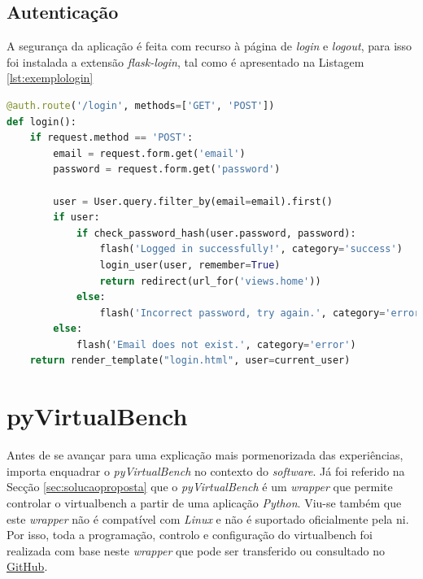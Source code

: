 \subsection{Autenticação}
A segurança da aplicação é feita com recurso à página de \textit{login} e \textit{logout}, para isso foi instalada a extensão \textit{flask-login}, tal como é apresentado na Listagem \ref{lst:exemplologin}

\begin{minipage}{0.9\linewidth}
	\begin{lstlisting}[language=Python, caption=Exemplo autenticação \textit{login}, label=lst:exemplologin]
@auth.route('/login', methods=['GET', 'POST'])
def login():
    if request.method == 'POST':
        email = request.form.get('email')
        password = request.form.get('password')

        user = User.query.filter_by(email=email).first()
        if user:
            if check_password_hash(user.password, password):
                flash('Logged in successfully!', category='success')
                login_user(user, remember=True)
                return redirect(url_for('views.home'))
            else:
                flash('Incorrect password, try again.', category='error')
        else:
            flash('Email does not exist.', category='error')
    return render_template("login.html", user=current_user) 
\end{lstlisting}
\end{minipage}

\section{pyVirtualBench}
\label{sec:pyvirtualbench}
Antes de se avançar para uma explicação mais pormenorizada das experiências, importa enquadrar o \textit{pyVirtualBench} no contexto do \textit{software}. Já foi referido na Secção \ref{sec:solucaoproposta} que o \textit{pyVirtualBench} é um \textit{wrapper} que permite controlar o \acrshort{virtualbench} a partir de uma aplicação \textit{Python}. Viu-se também que este \textit{wrapper} não é compatível com \textit{Linux} e não é suportado oficialmente pela \acrshort{ni}. Por isso, toda a programação, controlo e configuração do \acrshort{virtualbench} foi realizada com base neste \textit{wrapper} que pode ser transferido ou consultado no \href{https://github.com/armstrap/armstrap-pyvirtualbench/tree/master}{GitHub}.

